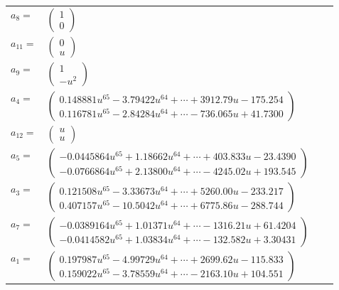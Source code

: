 \documentclass[1p]{elsarticle_modified}
\theoremstyle{definition}
\begin{document}
\begin{tabular}{m{7pt} m{180pt} m{7pt} m{180pt} }
\flushright $a_{8}=$&$\begin{pmatrix}1\\0\end{pmatrix}$ \\
\flushright $a_{11}=$&$\begin{pmatrix}0\\u\end{pmatrix}$ \\
\flushright $a_{9}=$&$\begin{pmatrix}1\\- u^2\end{pmatrix}$ \\
\flushright $a_{4}=$&$\begin{pmatrix}0.148881 u^{65}-3.79422 u^{64}+\cdots+3912.79 u-175.254\\0.116781 u^{65}-2.84284 u^{64}+\cdots-736.065 u+41.7300\end{pmatrix}$ \\
\flushright $a_{12}=$&$\begin{pmatrix}u\\u\end{pmatrix}$ \\
\flushright $a_{5}=$&$\begin{pmatrix}-0.0445864 u^{65}+1.18662 u^{64}+\cdots+403.833 u-23.4390\\-0.0766864 u^{65}+2.13800 u^{64}+\cdots-4245.02 u+193.545\end{pmatrix}$ \\
\flushright $a_{3}=$&$\begin{pmatrix}0.121508 u^{65}-3.33673 u^{64}+\cdots+5260.00 u-233.217\\0.407157 u^{65}-10.5042 u^{64}+\cdots+6775.86 u-288.744\end{pmatrix}$ \\
\flushright $a_{7}=$&$\begin{pmatrix}-0.0389164 u^{65}+1.01371 u^{64}+\cdots-1316.21 u+61.4204\\-0.0414582 u^{65}+1.03834 u^{64}+\cdots-132.582 u+3.30431\end{pmatrix}$ \\
\flushright $a_{1}=$&$\begin{pmatrix}0.197987 u^{65}-4.99729 u^{64}+\cdots+2699.62 u-115.833\\0.159022 u^{65}-3.78559 u^{64}+\cdots-2163.10 u+104.551\end{pmatrix}$ \\

\end{tabular}
\end{document}
